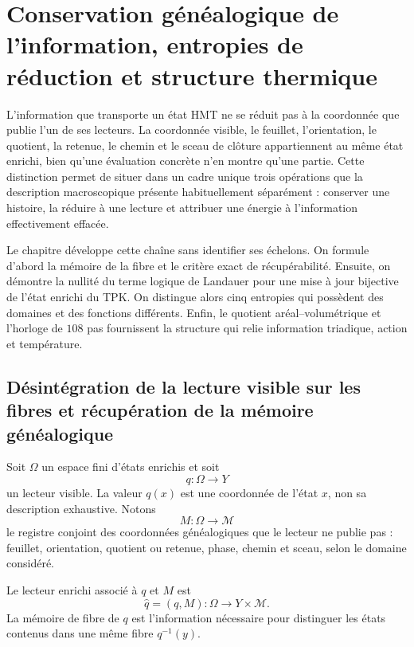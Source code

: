\chapter{Conservation généalogique de l'information, entropies de réduction et structure thermique}
\label{chap:informacion-entropia-landauer}

L'information que transporte un état HMT ne se réduit pas à la coordonnée que
publie l'un de ses lecteurs. La coordonnée visible, le feuillet, l'orientation,
le quotient, la retenue, le chemin et le sceau de clôture appartiennent au même
état enrichi, bien qu'une évaluation concrète n'en montre qu'une partie.
Cette distinction permet de situer dans un cadre unique trois opérations que la
description macroscopique présente habituellement séparément : conserver une histoire,
la réduire à une lecture et attribuer une énergie à l'information effectivement
effacée.

Le chapitre développe cette chaîne sans identifier ses échelons. On
formule d'abord la mémoire de la fibre et le critère exact de récupérabilité. Ensuite,
on démontre la nullité du terme logique de Landauer pour une mise à jour
bijective de l'état enrichi du TPK. On distingue alors cinq
entropies qui possèdent des domaines et des fonctions différents. Enfin, le quotient
aréal--volumétrique et l'horloge de \(108\) pas fournissent la structure qui
relie information triadique, action et température.

\section{Désintégration de la lecture visible sur les fibres et récupération de la mémoire généalogique}

Soit \(\Omega\) un espace fini d'états enrichis et soit
\[
 q:\Omega\longrightarrow Y
\]
un lecteur visible. La valeur \(q(x)\) est une coordonnée de l'état \(x\), non sa
description exhaustive. Notons
\[
 M:\Omega\longrightarrow\mathcal M
\]
le registre conjoint des coordonnées généalogiques que le lecteur ne publie pas :
feuillet, orientation, quotient ou retenue, phase, chemin et sceau, selon le domaine
considéré.

\begin{definition}
Le lecteur enrichi associé à \(q\) et \(M\) est
\begin{equation}
 \widehat q=(q,M):\Omega\longrightarrow Y\times\mathcal M.
 \label{eq:lector-enriquecido-informacion}
\end{equation}
La mémoire de fibre de \(q\) est l'information nécessaire pour distinguer les
états contenus dans une même fibre \(q^{-1}(y)\).
\end{definition}

